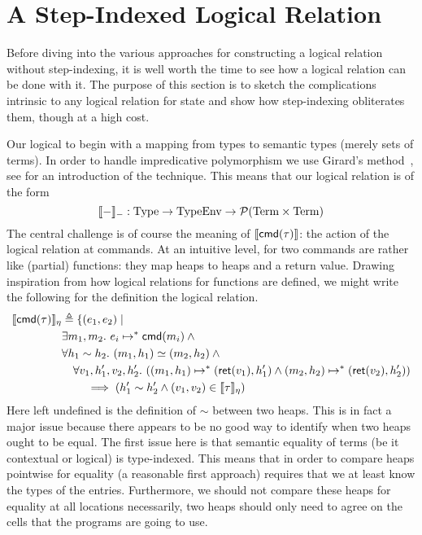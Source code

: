 \section{A Step-Indexed Logical Relation}\label{sec:steps}

Before diving into the various approaches for constructing a logical
relation without step-indexing, it is well worth the time to see how a
logical relation can be done with it. The purpose of this section is
to sketch the complications intrinsic to any logical relation for
state and show how step-indexing obliterates them, though at a high
cost.

Our logical to begin with a mapping from types to semantic types
(merely sets of terms). In order to handle impredicative polymorphism
we use Girard's method~\citep{Girard:71,Girard:72}, see
\citet{Harper:16} for an introduction of the technique. This means
that our logical relation is of the form
\[
  \llbracket - \rrbracket_{-} : \mathrm{Type} \to \mathrm{TypeEnv} \to \mathcal{P}(\mathrm{Term} \times \mathrm{Term})
\]
The central challenge is of course the meaning of $\llbracket \mathsf{cmd}(\tau) \rrbracket$:
the action of the logical relation at commands. At an intuitive level,
for two commands are rather like (partial) functions: they map heaps to heaps
and a return value. Drawing inspiration from how logical relations for
functions are defined, we might write the following for the definition
the logical relation.
\begin{align*}
  \llbracket \mathsf{cmd}(\tau) \rrbracket_\eta& \triangleq \{(e_1, e_2) \mid\\
  &\exists m_1, m_2.\ e_i \mapsto^* \mathsf{cmd}(m_i) \land{}\\
  &\forall h_1 \sim h_2.
  \ (m_1, h_1) \simeq (m_2, h_2) \land{}\\
  &\quad \forall v_1, h_1', v_2, h_2'.
  \ ((m_1, h_1) \mapsto^{*} (\mathsf{ret}(v_1), h_1') \land (m_2, h_2) \mapsto^{*} (\mathsf{ret}(v_2), h_2'))\\
  &\qquad \implies (h_1' \sim h_2' \land (v_1, v_2) \in \llbracket \tau \rrbracket_\eta)
\end{align*}
Here left undefined is the definition of $\sim$ between two
heaps. This is in fact a major issue because there appears to be no
good way to identify when two heaps ought to be equal. The first issue
here is that semantic equality of terms (be it contextual or logical)
is type-indexed. This means that in order to compare heaps pointwise
for equality (a reasonable first approach) requires that we at least
know the types of the entries. Furthermore, we should not compare these
heaps for equality at all locations necessarily, two heaps should only
need to agree on the cells that the programs are going to use.

